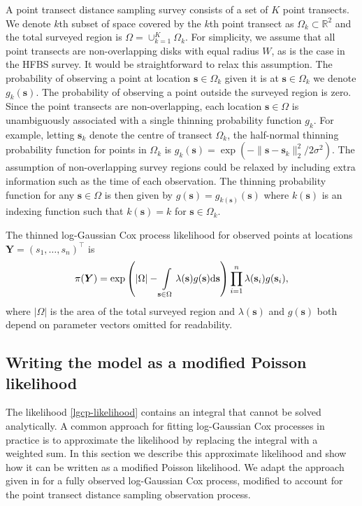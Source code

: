 \documentclass{statsoc}
\newcommand{\bs}{\mathbf{s}}
\newcommand{\bm}{\boldsymbol}  %
\begin{document}
A point transect distance sampling survey consists of a set of $K$ point transects.   We denote $k$th subset of space covered by the $k$th point transect as $\Omega_k \subset \mathbb{R}^2$ and the total surveyed region is $\Omega = \cup_{k=1}^K \Omega_k$.  For simplicity, we assume that all point transects are non-overlapping disks with equal radius $W$, as is the case in the HFBS survey.  It would be straightforward to relax this assumption.  The probability of observing a point at location $\bs \in \Omega_k$ given it is at $\bs \in \Omega_k$ we denote $g_k(\bs)$.  The probability of observing a point outside the surveyed region is zero.
Since the point transects are non-overlapping, each location $\bs \in \Omega$ is unambiguously associated with a single thinning probability function $g_k$.  For example, letting $\bs_k$ denote the centre of transect $\Omega_k$, the half-normal thinning probability function for points in $\Omega_k$ is $g_k(\bs) = \exp(-\lVert \bs - \bs_k \rVert_2^2 / 2\sigma^2)$.  The assumption of non-overlapping survey regions could be relaxed by including extra information such as the time of each observation.  The thinning probability function for any $\bs \in \Omega$ is then given by $g(\bs) = g_{k(\bs)}(\bs)$ where $k(\bs)$ is an indexing function such that $k(\bs) = k$ for $\bs \in \Omega_k$.

The thinned log-Gaussian Cox process likelihood for observed points at locations $\bm{Y} = (s_1, \ldots, s_n)^\intercal$ is
\begin{equation}
\label{lgcp-likelihood}
\pi(\bm{Y}) = \exp\left( |\Omega| -\int\displaylimits_{\bs \in \Omega} \lambda(\bs) g(\bs) \mathrm{d}\bs \right)\prod_{i=1}^n \lambda(\bs_i)g(\bs_i),
\end{equation}
where $|\Omega|$ is the area of the total surveyed region and $\lambda(\bs)$ and $g(\bs)$ both depend on parameter vectors omitted for readability.  

\subsection{Writing the model as a modified Poisson likelihood}

\sloppy The likelihood \eqref{lgcp-likelihood} contains an integral that cannot be solved analytically.  A common approach for fitting log-Gaussian Cox processes in practice is to approximate the likelihood by replacing the integral with a weighted sum.  In this section we describe this approximate likelihood and show how it can be written as a modified Poisson likelihood.  We adapt the approach given in \cite{simpson_going_2016} for a fully observed log-Gaussian Cox process, modified to account for the point transect distance sampling observation process.
\end{document}
